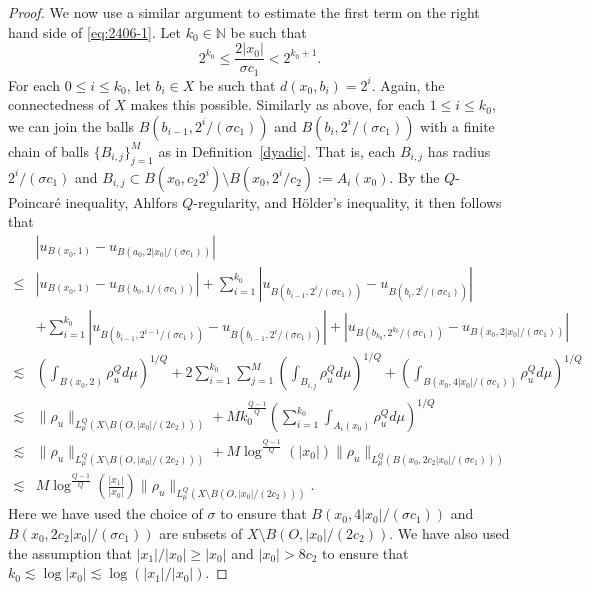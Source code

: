 \documentclass[10pt]{amsart}
\numberwithin{equation}{section}
\newcommand{\N}{\mathbb{N}}
\begin{document}
\begin{proof}
    We now use a similar argument to estimate the first term on the right hand side of \eqref{eq:2406-1}.  Let $k_0\in\N$ be such that 
    \[
    2^{k_0}\le \frac{2|x_0|}{\sigma c_1}<2^{k_0+1}.
    \]
    For each $0\le i\le k_0$, let $b_i\in X$ be such that $d(x_0,b_i)=2^i$.  Again, 
 the connectedness of $X$ makes this possible. Similarly as above, for each $1\le i\le k_0$, we can join the balls $B(b_{i-1},2^i/(\sigma c_1))$ and $B(b_i,2^i/(\sigma c_1))$ with a finite chain of balls $\{B_{i,j}\}_{j=1}^M$ as in Definition~\ref{dyadic}.  That is, each $B_{i,j}$ has radius $2^i/(\sigma c_1)$ and $B_{i,j}\subset B(x_0,c_2 2^i)\setminus B(x_0,2^i/c_2):=A_i(x_0)$.  
 By the $Q$-Poincar\'e inequality, Ahlfors $Q$-regularity, and H\"older's inequality, it then follows that 
 \begin{align}\label{eq:2806-1}
     &|u_{B(x_0,1)}-u_{B(a_0,2|x_0|/(\sigma c_1))}|\nonumber\\
     \le&|u_{B(x_0,1)}-u_{B(b_0,1/(\sigma c_1))}|\nonumber+\sum_{i=1}^{k_0}|u_{B(b_{i-1},2^i/(\sigma c_1))}-u_{B(b_i,2^i/(\sigma c_1))}|\\
     &+\sum_{i=1}^{k_0}|u_{B(b_{i-1}, 2^{i-1}/(\sigma c_1))}-u_{B(b_{i-1}, 2^i/(\sigma c_1))}|+|u_{B(b_{k_0},2^{k_0}/(\sigma c_1))}-u_{B(x_0,2|x_0|/(\sigma c_1))}|\nonumber\\
     \lesssim&\left(\int_{B(x_0,2)}\rho_u^Qd\mu\right)^{1/Q}+2\sum_{i=1}^{k_0}\sum_{j=1}^M\left(\int_{B_{i,j}}\rho_u^Qd\mu\right)^{1/Q}+\left(\int_{B(x_0,4|x_0|/(\sigma c_1))}\rho_u^Qd\mu\right)^{1/Q}\nonumber\\
     \lesssim&\|\rho_u\|_{L^Q_\mu(X\setminus B(O,|x_0|/(2 c_2)))}+Mk_0^{\frac{Q-1}{Q}}\left(\sum_{i=1}^{k_0}\int_{A_i(x_0)}\rho_u^Qd\mu\right)^{1/Q}\nonumber\\
    \lesssim&\|\rho_u\|_{L^Q_\mu(X\setminus B(O,|x_0|/(2 c_2)))}+M\log^{\frac{Q-1}{Q}}(|x_0|)\|\rho_u\|_{L^Q_\mu(B(x_0,2 c_2|x_0|/(\sigma c_1)))}\nonumber\\
    \lesssim& M\log^{\frac{Q-1}{Q}}\left(\frac{|x_1|}{|x_0|}\right)\|\rho_u\|_{L^Q_\mu(X\setminus B(O,|x_0|/(2 c_2)))}.
 \end{align}
 Here we have used the choice of $\sigma$ to ensure that $B(x_0,4|x_0|/(\sigma c_1))$ and $B(x_0, 2 c_2|x_0|/(\sigma c_1))$ are subsets of $X\setminus B(O, |x_0|/(2 c_2))$.  We have also used the assumption that $|x_1|/|x_0|\ge |x_0|$ and $|x_0|> 8 c_2$ to ensure that $k_0\lesssim\log|x_0|\lesssim\log(|x_1|/|x_0|)$.


\end{proof}
\end{document}
